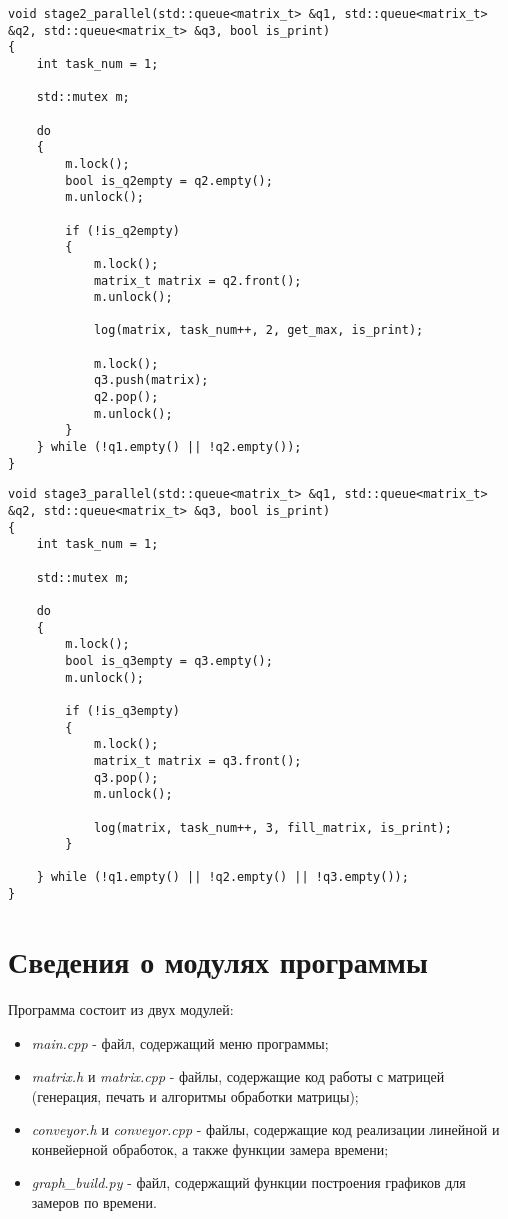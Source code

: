 \begin{center}
    \captionsetup{justification=raggedright,singlelinecheck=off}
    \begin{lstlisting}[label=lst:no_par_alg,caption=Алгоритм запуска 2 потока для нахождения максимального элемента матрицы]
void stage2_parallel(std::queue<matrix_t> &q1, std::queue<matrix_t> &q2, std::queue<matrix_t> &q3, bool is_print)
{
	int task_num = 1;

	std::mutex m;

	do
	{   
		m.lock();
		bool is_q2empty = q2.empty();
		m.unlock();

		if (!is_q2empty)
		{   
			m.lock();
			matrix_t matrix = q2.front();
			m.unlock();

			log(matrix, task_num++, 2, get_max, is_print);

			m.lock();
			q3.push(matrix);
			q2.pop();
			m.unlock();
		}
	} while (!q1.empty() || !q2.empty());
}
\end{lstlisting}
\end{center}

\clearpage

\begin{center}
    \captionsetup{justification=raggedright,singlelinecheck=off}
    \begin{lstlisting}[label=lst:no_par_alg,caption=Алгоритм запуска 3 потока для заполнения матрицы вычисленными значениями]
void stage3_parallel(std::queue<matrix_t> &q1, std::queue<matrix_t> &q2, std::queue<matrix_t> &q3, bool is_print)
{
	int task_num = 1;

	std::mutex m;

	do
	{
		m.lock();
		bool is_q3empty = q3.empty();
		m.unlock();

		if (!is_q3empty)
		{
			m.lock();
            matrix_t matrix = q3.front(); 
            q3.pop();
            m.unlock();

			log(matrix, task_num++, 3, fill_matrix, is_print);
		}

	} while (!q1.empty() || !q2.empty() || !q3.empty());
}
\end{lstlisting}
\end{center}

\section{Сведения о модулях программы}
Программа состоит из двух модулей:
\begin{itemize}
	\item \textit{main.cpp} - файл, содержащий меню программы;
    \item \textit{matrix.h} и \textit{matrix.cpp} - файлы, содержащие код работы с матрицей (генерация, печать и алгоритмы обработки матрицы);
	\item \textit{conveyor.h} и \textit{conveyor.cpp} - файлы, содержащие код реализации линейной и конвейерной обработок, а также функции замера времени;
	\item \textit{graph\_build.py} - файл, содержащий функции построения графиков для замеров по времени.
\end{itemize}


